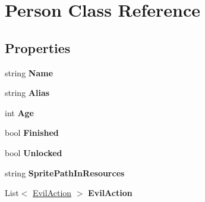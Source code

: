 \hypertarget{class_person}{}\section{Person Class Reference}
\label{class_person}
\subsection*{Properties}
\begin{DoxyCompactItemize}
\item 
\mbox{\label{class_person_a0d6be70593995cc5124b92117e4a80b0}} 
string {\bfseries Name}
\item 
\mbox{\label{class_person_a7c449dc4b8f61521e842b20e3625a7be}} 
string {\bfseries Alias}
\item 
\mbox{\label{class_person_a4d6848f2f7364bf79102b457ea9d5c1d}} 
int {\bfseries Age}
\item 
\mbox{\label{class_person_a79bbeb128635a64018bfd7b42e60cfa3}} 
bool {\bfseries Finished}
\item 
\mbox{\label{class_person_a14c775d11b3deaefc4e5e0d30cc972cb}} 
bool {\bfseries Unlocked}
\item 
\mbox{\label{class_person_a2939cf47a6c1dca8ef627edbad1b7d8a}} 
string {\bfseries Sprite\+Path\+In\+Resources}
\item 
\mbox{\label{class_person_ab90c7297b642e2bd80de84db346b673f}} 
List$<$ \mbox{\hyperlink{class_evil_action}{Evil\+Action}} $>$ {\bfseries Evil\+Action}

\end{DoxyCompactItemize}
